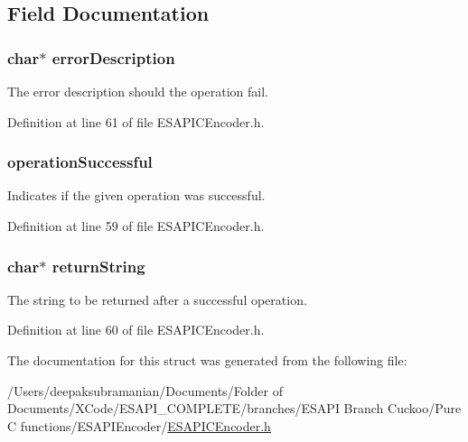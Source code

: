 \subsection{Field Documentation}
\hypertarget{struct_e_s_a_p_i_string_operation_a7104ebbe41498ebd092ce412fe884b10}{
\subsubsection[{errorDescription}]{\setlength{\rightskip}{0pt plus 5cm}char$\ast$ {\bf errorDescription}}}
\label{struct_e_s_a_p_i_string_operation_a7104ebbe41498ebd092ce412fe884b10}


The error description should the operation fail. 



Definition at line 61 of file ESAPICEncoder.h.

\hypertarget{struct_e_s_a_p_i_string_operation_a99cbce009aa937a6eb09f40510a95b73}{
\subsubsection[{operationSuccessful}]{ {\bf operationSuccessful}}}
\label{struct_e_s_a_p_i_string_operation_a99cbce009aa937a6eb09f40510a95b73}


Indicates if the given operation was successful. 



Definition at line 59 of file ESAPICEncoder.h.

\hypertarget{struct_e_s_a_p_i_string_operation_a020a35264b82bab27173507c25c46c6b}{
\subsubsection[{returnString}]{\setlength{\rightskip}{0pt plus 5cm}char$\ast$ {\bf returnString}}}
\label{struct_e_s_a_p_i_string_operation_a020a35264b82bab27173507c25c46c6b}


The string to be returned after a successful operation. 



Definition at line 60 of file ESAPICEncoder.h.



The documentation for this struct was generated from the following file:\begin{DoxyCompactItemize}
\item 
/Users/deepaksubramanian/Documents/Folder of Documents/XCode/ESAPI\_\-COMPLETE/branches/ESAPI Branch Cuckoo/Pure C functions/ESAPIEncoder/\hyperlink{_e_s_a_p_i_c_encoder_8h}{ESAPICEncoder.h}\end{DoxyCompactItemize}

